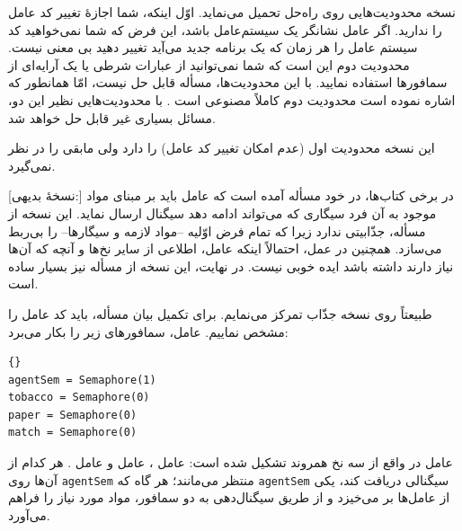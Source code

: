\documentclass{book}
\begin{document}
\begin{description}

\item
    [نسخهٔ غیرممکن:] نسخه  محدودیت‌هایی روی راه‌حل تحمیل می‌نماید. اوّل اینکه، شما اجازهٔ تغییر کد عامل را ندارید. 
    اگر عامل نشانگر یک سیستم‌عامل باشد، این فرض که شما نمی‌خواهید کد سیستم عامل را هر زمان که یک برنامه جدید می‌آید تغییر دهید 
    بی معنی نیست. 
    محدودیت دوم این است که شما نمی‌توانید از عبارات شرطی یا یک آرایه‌ای از سمافورها استفاده نمایید. با این محدودیت‌ها، 
    مسأله قابل حل نیست، امّا همانطور که   اشاره نموده است محدودیت دوم کاملاً مصنوعی است  \cite{Parnas}. 
    با محدودیت‌هایی نظیر این دو، مسائل بسیاری غیر قابل حل خواهد شد. 

\item
    [نسخهٔ جذّاب:] این نسخه محدودیت اول (عدم امکان تغییر کد عامل) را دارد ولی مابقی را در نظر نمی‌گیرد.
    
\item
    [نسخهٔ بدیهی:] در برخی کتاب‌ها، در خود مسأله آمده است که عامل باید بر مبنای مواد موجود به آن فرد سیگاری که 
    می‌تواند ادامه دهد سیگنال ارسال نماید. 
    این نسخه از مسأله، جذّابیتی ندارد زیرا که تمام فرض اوّلیه --مواد لازمه و سیگارها-- را بی‌ربط می‌سازد. همچنین در عمل، احتمالاً     
     اینکه عامل، اطلاعی از سایر نخ‌ها و آنچه که آن‌ها نیاز دارند داشته باشد ایده خوبی نیست. 
     در نهایت،  این نسخه از مسأله نیز بسیار ساده است.
     
\end{description}

    طبیعتاً روی نسخه جذّاب تمرکز می‌نمایم. برای تکمیل بیان مسأله، باید کد عامل را مشخص نماییم. عامل، سمافورهای زیر را بکار می‌برد:

\begin{latin}
\begin{lstlisting}[title=\rl{سمافورهای عامل}]{}
agentSem = Semaphore(1)
tobacco = Semaphore(0)
paper = Semaphore(0)
match = Semaphore(0)
\end{lstlisting}
\end{latin}

    عامل در واقع از سه نخ همروند تشکیل شده است:  عامل ،  عامل  و عامل .
    هر کدام از آن‌ها روی {\tt agentSem} منتظر می‌مانند؛ هر گاه که {\tt agentSem} سیگنالی دریافت کند، یکی از عامل‌ها بر می‌خیزد و 
    از طریق سیگنال‌دهی به دو سمافور، مواد مورد نیاز را فراهم می‌آورد. 
\end{document}
